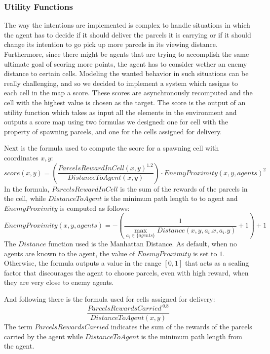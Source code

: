 \documentclass[a4paper, 11pt]{article}
\begin{document}
\subsubsection{Utility Functions}
The way the intentions are implemented is complex to handle situations in which the agent has to decide if it should deliver the parcels it is carrying or if it should change its intention to go pick up more parcels in its viewing distance. Furthermore, since there might be agents that are trying to accomplish the same ultimate goal of scoring more points, the agent has to consider wether an enemy distance to certain cells. Modeling the wanted behavior in such situations can be really challenging, and so we decided to implement a system which assigns to each cell in the map a score. These scores are asynchronously recomputed and the cell with the highest value is chosen as the target. The score is the output of an utility function which takes as input all the elements in the environment and outputs a score map using two formulas we designed: one for cell with the property of spawning parcels, and one for the cells assigned for delivery.

Next is the formula used to compute the score for a spawning cell with coordinates $x,y$:
\begin{equation}
score(x,y) = \left(\frac{{ParcelsRewardInCell(x,y)^{1.2}}}{{DistanceToAgent(x,y)}}\right) \cdot EnemyProximity(x,y,agents)^2
\end{equation}
In the formula, $ParcelsRewardInCell$ is the sum of the rewards of the parcels in the cell, while $DistanceToAgent$ is the minimum path length to to agent and $EnemyProximity$ is computed as follows:
\begin{equation}
EnemyProximity(x,y,agents) = -(\frac{1}{\max_{a_{i} \in \{agents\}} Distance(x, y, a_{i}.x, a_{i}.y)} + 1) + 1
\end{equation}
The $Distance$ function used is the Manhattan Distance. As default, when no agents are known to the agent, the value of $EnemyProximity$ is set to $1$. Otherwise, the formula outputs a value in the range $[0,1]$ that acts as a scaling factor that discourages the agent to choose parcels, even with high reward, when they are very close to enemy agents.

And following there is the formula used for cells assigned for delivery:
\begin{equation}
\frac{ParcelsRewardsCarried^{~0.8}}{DistanceToAgent(x,y)}
\end{equation}
The term $ParcelsRewardsCarried$ indicates the sum of the rewards of the parcels carried by the agent while $DistanceToAgent$ is the minimum path length from the agent.
\end{document}
